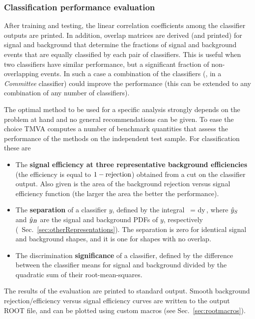 \subsubsection{Classification performance evaluation}

After training and testing, the linear correlation coefficients among
the classifier outputs are printed. In addition, overlap matrices are
derived (and printed) for signal and background that determine the
fractions of signal and background events that are equally classified
by each pair of classifiers. This is useful when two classifiers have
similar performance, but a significant fraction of non-overlapping
events. In such a case a combination of the classifiers (\eg, in a
{\em Committee} classifier) could improve the performance (this can be
extended to any combination of any number of classifiers).

The optimal method to be used for a specific analysis strongly depends on the
problem at hand and no general recommendations can be given. To ease the choice 
TMVA computes a number of benchmark quantities that assess the performance of the 
methods on the independent test sample. For classification these are 
\begin{itemize}

\item The {\bf signal efficiency at three representative background
  efficiencies} (the efficiency is equal to $1-{\rm rejection}$)
  obtained from a cut on the classifier output. Also given is the area
  of the background rejection versus signal efficiency function (the
  larger the area the better the performance).

\item The {\bf separation} \Separation 
      of a classifier $y$, defined by the integral~\cite{Cornelius} 
      \beq
          \Separation = 
           \int{} dy\,, 
      \eeq
      where ${\hat y}_{S}$ and ${\hat y}_{B}$ are the signal and background PDFs of $y$, 
      respectively (\cf\  Sec.~\ref{sec:otherRepresentations}). 
      The separation is zero for identical signal and background  
      shapes, and it is one for shapes with no overlap.

\item The discrimination {\bf significance} of a classifier, defined by the difference
  between the classifier means for signal and background divided by
  the quadratic sum of their root-mean-squares.

\end{itemize}
The results of the evaluation are printed to standard output. Smooth
background rejection/efficiency versus signal efficiency curves are
written to the output ROOT file, and can be plotted using custom
macros (see Sec.~\ref{sec:rootmacros}).

